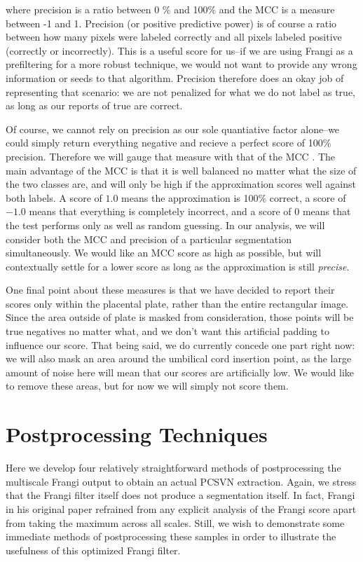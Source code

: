 where precision is a ratio between 0 \% and 100\% and the MCC is a measure between -1 and 1. Precision (or positive predictive power) is of course a ratio between how many pixels were labeled correctly and all pixels labeled positive (correctly or incorrectly). This is a useful score for us--if we are using Frangi as a prefiltering for a more robust technique, we would not want to provide any wrong information or seeds to that algorithm. Precision therefore does an okay job of representing that scenario: we are not penalized for what we do not label as true, as long as our reports of true are correct.

Of course, we cannot rely on precision as our sole quantiative factor alone--we could simply return everything negative and recieve a perfect score of 100\% precision. Therefore we will gauge that measure with that of the MCC \cite{mcc-original-paper}. The main advantage of the MCC is that it is well balanced no matter what the size of the two classes are, and will only be high if the approximation scores well against both labels. A score of $1.0$ means the approximation is 100\% correct, a score of $-1.0$ means that everything is completely incorrect, and a score of $0$ means that the test performs only as well as random guessing. In our analysis, we will consider both the MCC and precision of a particular segmentation simultaneously. We would like an MCC score as high as possible, but will contextually settle for a lower score as long as the approximation is still \textit{precise}.

One final point about these measures is that we have decided to report their scores only within the placental plate, rather than the entire rectangular image. Since the area outside of plate is masked from consideration, those points will be true negatives no matter what, and we don't want this artificial padding to influence our score. That being said, we do currently concede one part right now: we will also mask an area around the umbilical cord insertion point, as the large amount of noise here will mean that our scores are artificially low. We would like to remove these areas, but for now we will simply not score them. 

\section{Postprocessing Techniques}
Here we develop four relatively straightforward methods of postprocessing the multiscale Frangi output to obtain an actual PCSVN extraction. Again, we stress that the Frangi filter itself does not produce a segmentation itself. In fact, Frangi in his original paper \cite{frangi-paper} refrained from any explicit analysis of the Frangi score apart from taking the maximum across all scales. Still, we wish to demonstrate some immediate methods of postprocessing these samples in order to illustrate the usefulness of this optimized Frangi filter. 


